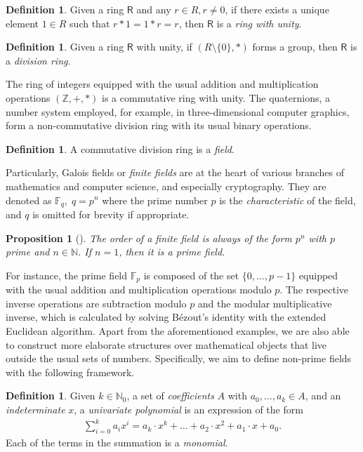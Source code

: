 \documentclass[12pt, a4paper, oneside]{memoir}
\newtheorem{proposition}[theorem]{Proposition}
\theoremstyle{definition}
\newtheorem{definition}[theorem]{Definition}
\begin{document}
\begin{definition}
  Given a ring $\mathsf{R}$ and any $r \in R, r \neq 0$, if there exists a unique element $1 \in R$ such that $r \ast 1 = 1 \ast r = r$, then $\mathsf{R}$ is a \emph{ring with unity}.
\end{definition}

\begin{definition}
  Given a ring $\mathsf{R}$ with unity, if $(R \setminus \{0\}, \ast)$ forms a group, then $\mathsf{R}$ is a \emph{division ring}.
\end{definition}

The ring of integers equipped with the usual addition and multiplication operations $(\mathbb{Z}, +, \ast)$ is a commutative ring with unity. The quaternions, a number system employed, for example, in three-dimensional computer graphics, form a non-commutative division ring with its usual binary operations.

\begin{definition}
  A commutative division ring is a \emph{field}.
\end{definition}

Particularly, Galois fields or \emph{finite fields} are at the heart of various branches of mathematics and computer science, and especially cryptography. They are denoted as $\mathbb{F}_{q},\; q = p^{n}$ where the prime number $p$ is the \emph{characteristic} of the field, and $q$ is omitted for brevity if appropriate.

\begin{proposition}[{\cite[Cor.~2.18]{Mullen:2013}}]
  The order of a finite field is always of the form $p^{n}$ with $p$ prime and $n \in \mathbb{N}$. If $n = 1$, then it is a \emph{prime field}.
\end{proposition}

For instance, the prime field $\mathbb{F}_{p}$ is composed of the set $\{0, \dots, p - 1\}$ equipped with the usual addition and multiplication operations modulo $p$. The respective inverse operations are subtraction modulo $p$ and the modular multiplicative inverse, which is calculated by solving Bézout's identity with the extended Euclidean algorithm. Apart from the aforementioned examples, we are also able to construct more elaborate structures over mathematical objects that live outside the usual sets of numbers. Specifically, we aim to define non-prime fields with the following framework.

\begin{definition}
  Given $k \in \mathbb{N}_{0}$, a set of \emph{coefficients} $A$ with $a_{0}, \dots, a_{k} \in A$, and an \emph{indeterminate} $x$, a \emph{univariate polynomial} is an expression of the form
  \begin{align}
    \sum_{i = 0}^{k} a_{i} x^{i} 
      = a_{k} \cdot x^{k} + \dots + a_{2} \cdot x^{2} + a_{1} \cdot x + a_{0}.
  \end{align}
  Each of the terms in the summation is a \emph{monomial}.
\end{definition}
\end{document}
